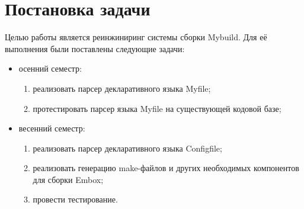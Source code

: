 
\section{Постановка задачи}
\label{sec:task}
Целью работы является реинжиниринг системы сборки Mybuild. Для её выполнения были поставлены следующие задачи:
\begin{itemize}
	\item осенний семестр: \begin{enumerate}
		      \item реализовать парсер декларативного языка Myfile;
		      \item протестировать парсер языка Myfile на существующей кодовой базе;
	      \end{enumerate}
	\item весенний семестр: \begin{enumerate}
		      \item реализовать парсер декларативного языка Configfile;
		      \item реализовать генерацию make-файлов и других необходимых компонентов для сборки Embox;
		      \item провести тестирование.
	      \end{enumerate}
\end{itemize}
